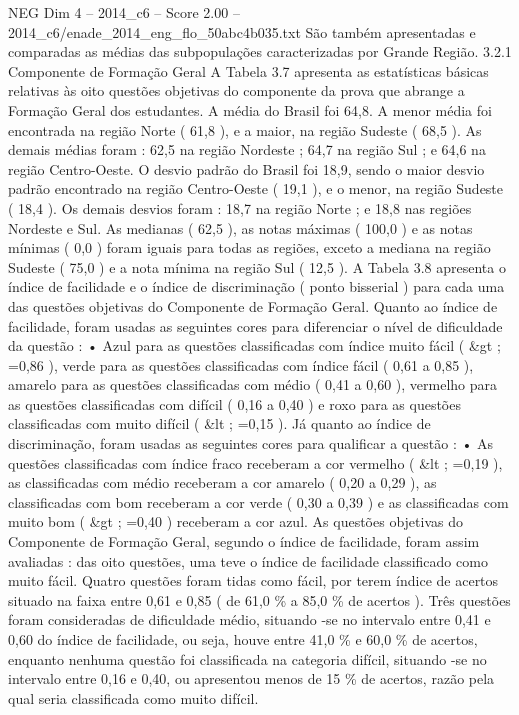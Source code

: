 \begin{textsample}{NEG Dim 4 – 2014\_c6 – Score 2.00 – 2014\_c6/enade\_2014\_eng\_flo\_50abc4b035.txt}
São também apresentadas e comparadas as médias das subpopulações caracterizadas por Grande Região. 3.2.1 Componente de Formação Geral A Tabela 3.7 apresenta as estatísticas básicas relativas às oito questões objetivas do componente da prova que abrange a Formação Geral dos estudantes.
A média do Brasil foi 64,8.
A menor média foi encontrada na região Norte ( 61,8 ), e a maior, na região Sudeste ( 68,5 ).
As demais médias foram : 62,5 na região Nordeste ; 64,7 na região Sul ; e 64,6 na região Centro-Oeste.
O desvio padrão do Brasil foi 18,9, sendo o maior desvio padrão encontrado na região Centro-Oeste ( 19,1 ), e o menor, na região Sudeste ( 18,4 ).
Os demais desvios foram : 18,7 na região Norte ; e 18,8 nas regiões Nordeste e Sul.
As medianas ( 62,5 ), as notas máximas ( 100,0 ) e as notas mínimas ( 0,0 ) foram iguais para todas as regiões, exceto a mediana na região Sudeste ( 75,0 ) e a nota mínima na região Sul ( 12,5 ).
A Tabela 3.8 apresenta o índice de facilidade e o índice de discriminação ( ponto bisserial ) para cada uma das questões objetivas do Componente de Formação Geral.
Quanto ao índice de facilidade, foram usadas as seguintes cores para diferenciar o nível de dificuldade da questão : • Azul para as questões classificadas com índice muito fácil ( \&gt ; =0,86 ), verde para as questões classificadas com índice fácil ( 0,61 a 0,85 ), amarelo para as questões classificadas com médio ( 0,41 a 0,60 ), vermelho para as questões classificadas com difícil ( 0,16 a 0,40 ) e roxo para as questões classificadas com muito difícil ( \&lt ; =0,15 ).
Já quanto ao índice de discriminação, foram usadas as seguintes cores para qualificar a questão : • As questões classificadas com índice fraco receberam a cor vermelho ( \&lt ; =0,19 ), as classificadas com médio receberam a cor amarelo ( 0,20 a 0,29 ), as classificadas com bom receberam a cor verde ( 0,30 a 0,39 ) e as classificadas com muito bom ( \&gt ; =0,40 ) receberam a cor azul.
As questões objetivas do Componente de Formação Geral, segundo o índice de facilidade, foram assim avaliadas : das oito questões, uma teve o índice de facilidade classificado como muito fácil.
Quatro questões foram tidas como fácil, por terem índice de acertos situado na faixa entre 0,61 e 0,85 ( de 61,0 \% a 85,0 \% de acertos ).
Três questões foram consideradas de dificuldade médio, situando -se no intervalo entre 0,41 e 0,60 do índice de facilidade, ou seja, houve entre 41,0 \% e 60,0 \% de acertos, enquanto nenhuma questão foi classificada na categoria difícil, situando -se no intervalo entre 0,16 e 0,40, ou apresentou menos de 15 \% de acertos, razão pela qual seria classificada como muito difícil.

\end{textsample}
